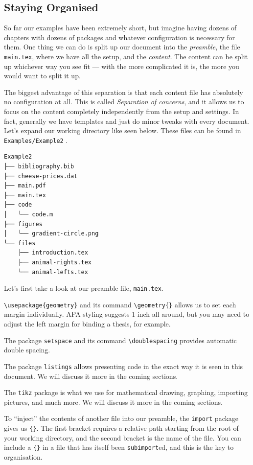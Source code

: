 \subsection{Staying Organised}
So far our examples have been extremely short, but imagine having dozens of chapters with dozens of packages and whatever configuration is necessary for them.
One thing we can do is split up our document into the \emph{preamble}, the file \verb|main.tex|, where we have all the setup, and the \emph{content}.
The content can be split up whichever way you see fit --- with the more complicated it is, the more you would want to split it up. 

The biggest advantage of this separation is that each content file has absolutely no configuration at all.
This is called \emph{Separation of concerns}, and it allows us to focus on the content completely independently from the setup and settings.
In fact, generally we have templates and just do minor tweaks with every document.
\clearpage
Let's expand our working directory like seen below. These files can be found in \verb|Examples/Example2| .
\begin{verbatim}
Example2
├── bibliography.bib
├── cheese-prices.dat
├── main.pdf
├── main.tex
├── code
│   └── code.m
├── figures
│   └── gradient-circle.png
└── files
    ├── introduction.tex
    ├── animal-rights.tex
    └── animal-lefts.tex
\end{verbatim}

Let's first take a look at our preamble file, \verb|main.tex|.



\verb|\usepackage{geometry}| and its command \verb|\geometry{}| allows us to set each margin individually.
APA styling suggests 1 inch all around, but you may need to adjust the left margin for binding a thesis, for example.

The package \verb|setspace| and its command \verb|\doublespacing| provides automatic double spacing.

The package \verb|listings| allows presenting code in the exact way it is seen in this document. We will discuss it more in the coming sections.

The \verb|tikz| package is what we use for mathematical drawing, graphing, importing pictures, and much more.
We will discuss it more in the coming sections.

To ``inject'' the contents of another file into our preamble, the \verb|import| package gives us \verb|{}|.
The first bracket requires a relative path starting from the root of your working directory, and the second bracket is the name of the file.
You can include a \verb|{}| in a file that has itself been \texttt{subimport}ed, and this is the key to organisation.

